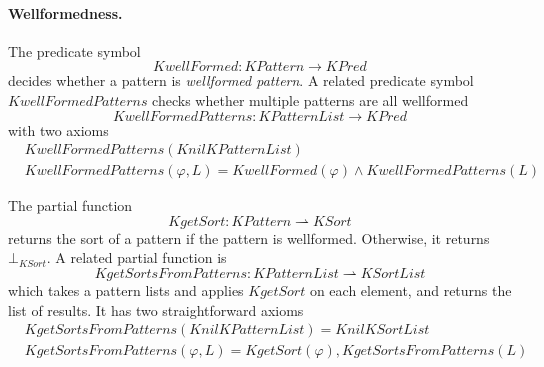 \documentclass[UTF8,11pt]{article}
\theoremstyle{plain}
\theoremstyle{definition}
\theoremstyle{remark}
\newcommand{\KPred}{\mathit{KPred}}
\newcommand{\KSort}{\mathit{KSort}}
\newcommand{\KPatternList}{\mathit{KPatternList}}
\newcommand{\KnilKPatternList}{\mathit{KnilKPatternList}}
\newcommand{\KSortList}{\mathit{KSortList}}
\newcommand{\KnilKSortList}{\mathit{KnilKSortList}}
\newcommand{\KPattern}{\mathit{KPattern}}
\newcommand{\KwellFormed}{\mathit{KwellFormed}}
\newcommand{\KwellFormedPatterns}{\mathit{KwellFormedPatterns}}
\newcommand{\KgetSort}{\mathit{KgetSort}}
\newcommand{\KgetSortsFromPatterns}{\mathit{KgetSortsFromPatterns}}
\begin{document}
\paragraph{Wellformedness.}
The predicate symbol
$$\KwellFormed \colon \KPattern \to \KPred$$ 
decides whether a pattern is \emph{wellformed pattern}.
A related predicate symbol $\KwellFormedPatterns$ checks whether multiple 
patterns are all wellformed
$$ \KwellFormedPatterns \colon \KPatternList \to \KPred$$
with two axioms
\begin{align*}
& \KwellFormedPatterns(\KnilKPatternList) \\
& \KwellFormedPatterns(\varphi, L) = \KwellFormed(\varphi) \wedge 
\KwellFormedPatterns(L)
\end{align*}

The partial function
$$\KgetSort \colon \KPattern \rightharpoonup \KSort$$
returns the sort of a pattern if the pattern is wellformed.
Otherwise, it returns $\bot_\KSort$.
A related partial function is 
$$ \KgetSortsFromPatterns \colon \KPatternList \rightharpoonup \KSortList
$$
which takes a pattern lists and applies $\KgetSort$ on each element, and 
returns 
the list of results.
It has two straightforward axioms
\begin{align*}
  & \KgetSortsFromPatterns(\KnilKPatternList) = \KnilKSortList
  \\
  & \KgetSortsFromPatterns(\varphi, L) = \KgetSort(\varphi), 
  \KgetSortsFromPatterns(L)
\end{align*}
\end{document}
